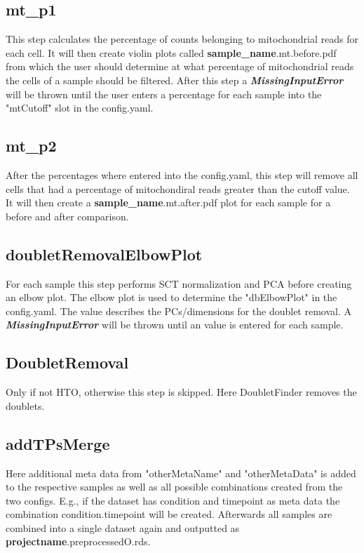 \subsection{mt\_p1}
This step calculates the percentage of counts belonging to mitochondrial reads for each cell. It will then create violin plots called \textbf{sample\_name}.mt.before.pdf from which the user should determine at what percentage of mitochondrial reads the cells of a sample should be filtered. After this step a \textbf{\textit{MissingInputError}} will be thrown until the user enters a percentage for each sample into the "mtCutoff" slot in the config.yaml.

\subsection{mt\_p2}
After the percentages where entered into the config.yaml, this step will remove all cells that had a percentage of mitochondiral reads greater than the cutoff value. It will then create a \textbf{sample\_name}.mt.after.pdf plot for each sample for a before and after comparison.

\subsection{doubletRemovalElbowPlot}
For each sample this step performs SCT normalization and PCA before creating an elbow plot. The elbow plot is used to determine the "dbElbowPlot" in the config.yaml. The value describes the PCs/dimensions for the doublet removal. A \textbf{\textit{MissingInputError}} will be thrown until an value is entered for each sample.

\subsection{DoubletRemoval}
Only if not HTO, otherwise this step is skipped. Here DoubletFinder removes the doublets.

\subsection{addTPsMerge}
Here additional meta data from "otherMetaName" and "otherMetaData" is added to the respective samples as well as all possible combinations created from the two configs. E.g., if the dataset has condition and timepoint as meta data the combination condition.timepoint will be created. Afterwards all samples are combined into a single dataset again and outputted as \textbf{projectname}.preprocessedO.rds.

